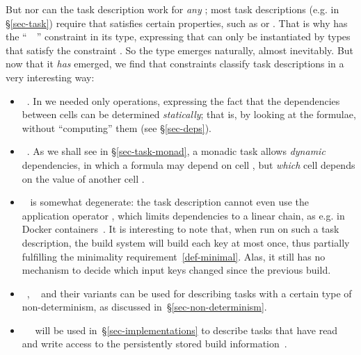 But nor can the task description work for \emph{any} ; most task
descriptions (e.g.  in \S\ref{sec-task}) require that 
satisfies certain properties, such as  or . That is
why  has the ``~~\hs{=>}'' constraint in its type,
expressing that  can only be instantiated by types that satisfy the
constraint . So the type  emerges naturally, almost inevitably.
But now that it \emph{has} emerged, we find that constraints  classify
task descriptions in a very interesting way:
\begin{itemize}
\item {}~. In  we needed only 
  operations, expressing the fact that the dependencies between cells can be
  determined \emph{statically}; that is, by looking at the formulae, without
  ``computing'' them (see \S\ref{sec-deps}).
\item {}~. As we shall see in \S\ref{sec-task-monad}, a monadic
  task allows \emph{dynamic} dependencies, in which a formula may depend on cell
  , but \emph{which} cell  depends on the value of another cell
  .
\item {}~ is somewhat degenerate: the task description cannot
  even use the application operator \hs{<*>}, which limits dependencies to a
  linear chain, as e.g. in Docker containers~\cite{docker}. It is
  interesting to note that, when run on such a task description, the 
  build system will build each key at most once, thus partially fulfilling the
  minimality requirement~\ref{def-minimal}. Alas, it still has no mechanism to
  decide which input keys changed since the previous build.
\item {}~, ~ and their
  variants can be used for describing tasks with a certain type of
  non-determinism, as discussed in~\S\ref{sec-non-determinism}.
\item {}~~ will be used
  in~\S\ref{sec-implementations} to describe tasks that have read and write
  access to the persistently stored build information~.
\end{itemize}

%
%
%

